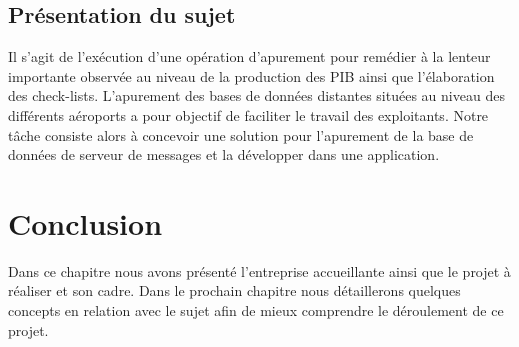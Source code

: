 \subsection{Présentation du sujet}
Il s'agit de l’exécution d’une opération d’apurement pour remédier à la lenteur importante observée au niveau de la production des PIB ainsi que l’élaboration des check-lists. L’apurement des bases de données distantes situées au niveau des différents aéroports a pour objectif de faciliter le travail des exploitants. Notre tâche consiste alors à concevoir une solution pour l'apurement de la base de données de serveur de messages et la développer dans une application.\\
\section*{Conclusion}

Dans ce chapitre nous avons présenté l’entreprise accueillante ainsi que le projet à réaliser et son cadre. Dans le prochain chapitre nous détaillerons quelques concepts en relation avec le sujet afin de mieux
comprendre le déroulement de ce projet.


